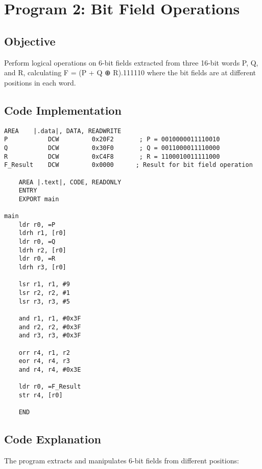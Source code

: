 \documentclass[12pt,a4paper]{article}
\begin{document}
\newpage
\section{Program 2: Bit Field Operations}

\subsection{Objective}
Perform logical operations on 6-bit fields extracted from three 16-bit words P, Q, and R, calculating F = (P + Q ⊕ R).111110 where the bit fields are at different positions in each word.

\subsection{Code Implementation}

\begin{lstlisting}[style=assembly, caption=Bit Field Operations Implementation]
    AREA    |.data|, DATA, READWRITE
P           DCW         0x20F2       ; P = 0010000011110010
Q           DCW         0x30F0       ; Q = 0011000011110000
R           DCW         0xC4F8       ; R = 1100010011111000
F_Result    DCW         0x0000      ; Result for bit field operation

    AREA |.text|, CODE, READONLY
    ENTRY
    EXPORT main

main
    ldr r0, =P
    ldrh r1, [r0]
    ldr r0, =Q
    ldrh r2, [r0]
    ldr r0, =R
    ldrh r3, [r0]

    lsr r1, r1, #9
    lsr r2, r2, #1
    lsr r3, r3, #5

    and r1, r1, #0x3F
    and r2, r2, #0x3F
    and r3, r3, #0x3F

    orr r4, r1, r2
    eor r4, r4, r3
    and r4, r4, #0x3E

    ldr r0, =F_Result
    str r4, [r0]

    END
\end{lstlisting}

\subsection{Code Explanation}

The program extracts and manipulates 6-bit fields from different positions:
\end{document}

